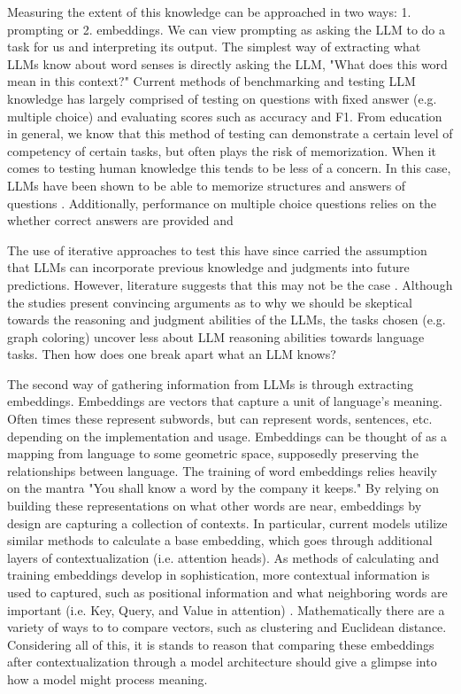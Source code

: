 \documentclass{brandeis-thesis3.2}
\theoremstyle{plain}
\theoremstyle{definition}
\theoremstyle{remark}
\numberwithin{equation}{section}
\renewcommand\cite{\citep}
\begin{document}
Measuring the extent of this knowledge can be approached in two ways: 1. prompting or 2. embeddings. We can view prompting as asking the LLM to do a task for us and interpreting its output. The simplest way of extracting what LLMs know about word senses is directly asking the LLM, "What does this word mean in this context?" Current methods of benchmarking and testing LLM knowledge has largely comprised of testing on questions with fixed answer (e.g. multiple choice) and evaluating scores such as accuracy and F1. From education in general, we know that this method of testing can demonstrate a certain level of competency of certain tasks, but often plays the risk of memorization. When it comes to testing human knowledge this tends to be less of a concern. In this case, LLMs have been shown to be able to memorize structures and answers of questions \cite{}. Additionally, performance on multiple choice questions relies on the whether correct answers are provided and  

The use of iterative approaches to test this have since carried the assumption that LLMs can incorporate previous knowledge and judgments into future predictions. However, literature suggests that this may not be the case \cite{dziri_faith_2023}. Although the studies present convincing arguments as to why we should be skeptical towards the reasoning and judgment abilities of the LLMs, the tasks chosen (e.g. graph coloring) uncover less about LLM reasoning abilities towards language tasks. Then how does one break apart what an LLM knows? 

The second way of gathering information from LLMs is through extracting embeddings. Embeddings are vectors that capture a unit of language's meaning. Often times these represent subwords, but can represent words, sentences, etc. depending on the implementation and usage. Embeddings can be thought of as a mapping from language to some geometric space, supposedly preserving the relationships between language. The training of word embeddings relies heavily on the mantra "You shall know a word by the company it keeps." By relying on building these representations on what other words are near, embeddings by design are capturing a collection of contexts. In particular, current models utilize similar methods to calculate a base embedding, which goes through additional layers of contextualization (i.e. attention heads). As methods of calculating and training embeddings develop in sophistication, more contextual information is used to captured, such as positional information and what neighboring words are important (i.e. Key, Query, and Value in attention) \cite{vaswani_attention_2023}. Mathematically there are a variety of ways to to compare vectors, such as clustering and Euclidean distance. Considering all of this, it is stands to reason that comparing these embeddings after contextualization through a model architecture should give a glimpse into how a model might process meaning.
\end{document}
